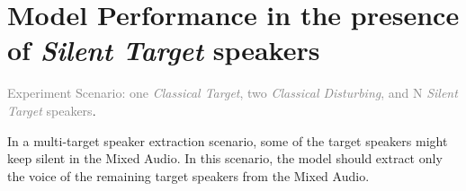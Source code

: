\begin{table*}[t]
\begin{center}
\begin{small}
\begin{minipage}{0.49\textwidth}
\caption{Model performance when different numbers of \textit{Additional Disturbing} (AD) speakers are present.}
\label{tab:ad}
\vskip 0.15in

\end{minipage}
\end{small}
\end{center}
\vskip -0.1in
\end{table*}


\section{Model Performance in the presence of \textit{Silent Target} speakers}

\textcolor{gray}{Experiment Scenario: one \textit{Classical Target}, two \textit{Classical Disturbing}, and N \textit{Silent Target} speakers}.

In a multi-target speaker extraction scenario, some of the target speakers might keep silent in the Mixed Audio. In this scenario, the model should extract only the voice of the remaining target speakers from the Mixed Audio.

